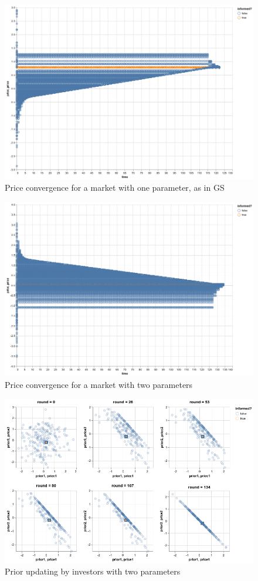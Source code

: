 \documentclass[11pt]{article}
\begin{document}
\begin{figure}[htbp]
\centering
\includegraphics[width=.9\linewidth]{./plots/1-param-price.png}
\caption{\label{fig:org80c324a}
Price convergence for a market with one parameter, as in GS}
\end{figure}


\begin{figure}[htbp]
\centering
\includegraphics[width=.9\linewidth]{./plots/2-param-price.png}
\caption{\label{fig:orgbb4d8bb}
Price convergence for a market with two parameters}
\end{figure}

\begin{figure}[htbp]
\centering
\includegraphics[width=.9\linewidth]{./plots/2-param-investors.png}
\caption{\label{fig:orge0cf8ae}
Prior updating by investors with two parameters}
\end{figure}
\end{document}
